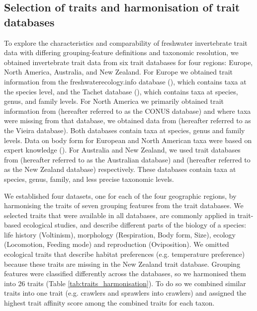\documentclass{article}
\begin{document}
\subsection*{Selection of traits and harmonisation of trait databases}

To explore the characteristics and comparability of freshwater invertebrate trait data with differing grouping-feature definitions and taxonomic resolution, we obtained invertebrate trait data from six trait databases for four regions: Europe, North America, Australia, and New Zealand. For Europe we obtained trait information from the freshwaterecology.info database (\cite{schmidt-kloiber_www.freshwaterecology.info_2015}), which contains taxa at the species level, and the Tachet database (\cite{ussegliopolatera_biological_2000}), which contains taxa at species, genus, and family levels. For North America we primarily obtained trait information from \citet{twardochleb_freshwater_nodate} (hereafter referred to as the CONUS database) and where taxa were missing from that database, we obtained data from \citet{vieira_database_nodate} (hereafter referred to as the Vieira database). Both databases contain taxa at species, genus and family levels. Data on body form for European and North American taxa were based on expert knowledge (\cite{polatera_personal_information_2020}). For Australia and New Zealand, we used trait databases from \citet{kefford_integrated_2020} (hereafter referred to as the Australian database) and \citet{Philips_and_Smith_NZ_DB_2018} (hereafter referred to as the New Zealand database) respectively. These databases contain taxa at species, genus, family, and less precise taxonomic levels.

We established four datasets, one for each of the four geographic regions, by harmonising the traits of seven grouping features from the trait databases. We selected traits that were available in all databases, are commonly applied in trait-based ecological studies, and describe different parts of the biology of a species: life history (Voltinism), morphology (Respiration, Body form, Size), ecology (Locomotion, Feeding mode) and reproduction (Oviposition). We omitted ecological traits that describe habitat preferences (e.g. temperature preference) because these traits are missing in the New Zealand trait database. Grouping features were  classified differently across the databases, so we harmonised them into 26 traits (Table \ref{tab:traits_harmonisation}). To do so we combined  similar traits into one trait (e.g. crawlers and sprawlers into crawlers) and assigned the highest trait affinity score among the combined traits for each taxon.  
\end{document}
